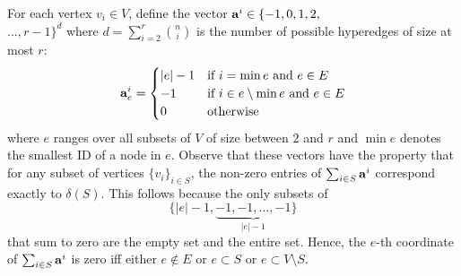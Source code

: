 
For each vertex $v_i\in V$, define the vector $\mathbf{a}^i\in \{-1,0,1,2, $ \\ $\ldots, r-1\}^d$ where $d=\sum_{i=2}^r {n\choose i}$ is the number of possible hyperedges of size at most $r$:
 \[
  \mathbf{a}^i_{e}=
\begin{cases}
   |e|-1     & \mbox{if } i=\min e \mbox{ and } e \in E \\
   -1     & \mbox{if } i\in e\setminus \min e  \mbox{ and }  e \in E \\
   0      & \mbox{otherwise}
\end{cases}
 \]
 where $e$ ranges over all subsets of $V$ of size between $2$ and $r$ and $\min e$ denotes the smallest ID of a node in $e$.
Observe that these vectors have the property that
for any subset of vertices $\{v_i\}_{i\in S}$, the non-zero entries of $\sum_{i\in S} \mathbf{a}^i$ correspond exactly to $\delta(S)$. This follows because the only subsets of 
\[\{|e|-1, \underbrace{-1, -1, \ldots, -1}_{|e|-1}\}\]
that sum to zero are the empty set and the entire set. Hence, the $e$-th coordinate of $\sum_{i\in S} \mathbf{a}^i$ is zero iff either $e\not \in E$ or $e\subset S$ or $e\subset V\setminus S$.

